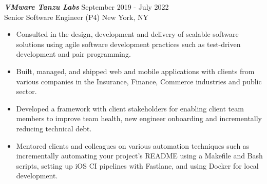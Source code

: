 {\sl \textbf{VMware Tanzu Labs}} \hfill September 2019 - July 2022 \\ Senior Software Engineer (P4) \hfill New York, NY
\begin{itemize}
    \item Consulted in the design, development and delivery of scalable software solutions using agile software development practices such as test-driven development and pair programming.
    \item Built, managed, and shipped web and mobile applications with clients from various companies in the Insurance, Finance, Commerce industries and public sector.
    \item Developed a framework with client stakeholders for enabling client team members to improve team health, new engineer onboarding and incrementally reducing technical debt.
    \item Mentored clients and colleagues on various automation techniques such as incrementally automating your project's README using a Makefile and Bash scripts, setting up iOS CI pipelines with Fastlane, and using Docker for local development.
\end{itemize}
